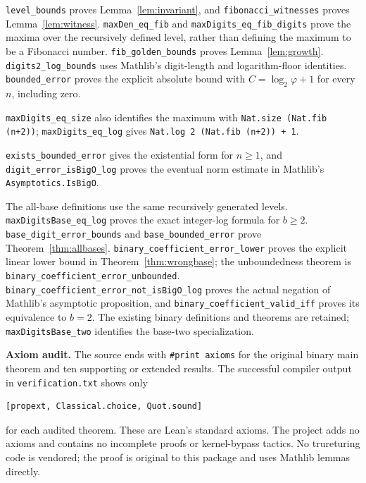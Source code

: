 \documentclass[11pt]{article}
\newcommand{\ph}{\varphi}
\begin{document}
{\raggedright
\texttt{level\_bounds} proves Lemma~\ref{lem:invariant}, and
\texttt{fibonacci\_witnesses} proves Lemma~\ref{lem:witness}.
\texttt{maxDen\_eq\_fib} and \texttt{maxDigits\_eq\_fib\_digits} prove
the maxima over the recursively defined level, rather than defining the
maximum to be a Fibonacci number.
\texttt{fib\_golden\_bounds} proves Lemma~\ref{lem:growth}.
\texttt{digits2\_log\_bounds} uses Mathlib's digit-length and logarithm-floor
identities. \texttt{bounded\_error} proves the explicit absolute bound
with $C=\log_2\ph+1$ for every $n$, including zero.

\texttt{maxDigits\_eq\_size} also identifies the maximum with
\texttt{Nat.size (Nat.fib (n+2))}; \texttt{maxDigits\_eq\_log} gives
\texttt{Nat.log 2 (Nat.fib (n+2)) + 1}.

\texttt{exists\_bounded\_error} gives the existential form for
$n\ge1$, and \texttt{digit\_error\_isBigO\_log} proves the eventual
norm estimate in Mathlib's \texttt{Asymptotics.IsBigO}.\par}

{\raggedright
The all-base definitions use the same recursively generated levels.
\texttt{maxDigitsBase\_eq\_log} proves the exact integer-log formula for
$b\ge2$. \texttt{base\_digit\_error\_bounds} and
\texttt{base\_bounded\_error} prove Theorem~\ref{thm:allbases}.
\texttt{binary\_coefficient\_error\_lower} proves the explicit linear lower
bound in Theorem~\ref{thm:wrongbase}; the unboundedness theorem is
\texttt{binary\_coefficient\_error\_unbounded}.
\texttt{binary\_coefficient\_error\_not\_isBigO\_log} proves the actual
negation of Mathlib's asymptotic proposition, and
\texttt{binary\_coefficient\_valid\_iff} proves its equivalence to $b=2$.
The existing binary definitions and theorems are retained;
\texttt{maxDigitsBase\_two} identifies the base-two specialization.\par}

\textbf{Axiom audit.} The source ends with \texttt{\#print axioms} for the
original binary main theorem and ten supporting or extended results. The successful compiler output
in \texttt{verification.txt} shows only
\begin{Verbatim}[fontsize=\small]
[propext, Classical.choice, Quot.sound]
\end{Verbatim}
for each audited theorem. These are Lean's standard axioms. The project
adds no axioms and contains no incomplete proofs or kernel-bypass tactics.
No trureturing code is vendored; the proof is original to this package and
uses Mathlib lemmas directly.
\end{document}
